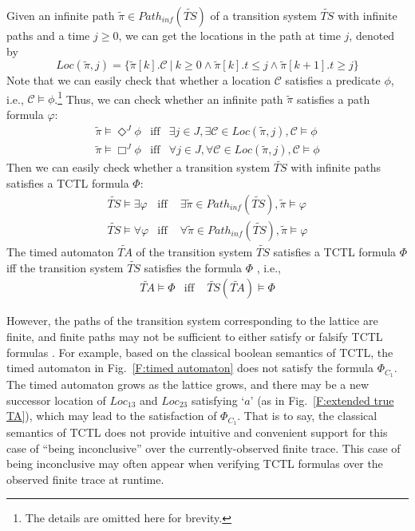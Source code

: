 \documentclass[10pt,conference,compsocconf,letterpaper]{IEEEtran}
\begin{document}
Given an infinite path $\widetilde{\pi}\in Path_{inf}(\widetilde{TS})$ of a transition system $\widetilde{TS}$ with infinite paths and a time $j \geq 0$, we can get the locations in the path at time $j$, denoted by
$$Loc(\widetilde{\pi}, j) =\{\widetilde{\pi}[k].\mathcal{C}~|~k\geq 0 \wedge \widetilde{\pi}[k].t\leq j \wedge \widetilde{\pi}[k+1].t\geq j\}$$
Note that we can easily check that whether a location $\mathcal{C}$ satisfies a predicate $\phi$, i.e., $\mathcal{C}\models \phi$.\footnote{The details are omitted here for brevity.} Thus, we can check whether an infinite path $\widetilde{\pi}$ satisfies a path formula $\varphi$:
\begin{eqnarray}
    \widetilde{\pi} \models \Diamond^J \phi & \textrm{iff} & \exists j\in J, \exists \mathcal{C}\in Loc(\widetilde{\pi}, j), \mathcal{C}\models \phi \\
    \widetilde{\pi} \models \Box^J \phi & \textrm{iff} & \forall j\in J, \forall \mathcal{C}\in Loc(\widetilde{\pi}, j), \mathcal{C}\models \phi
\end{eqnarray}
Then we can easily check whether a transition system $\widetilde{TS}$ with infinite paths satisfies a TCTL formula $\Phi$:
\begin{eqnarray}\label{eq:inf TS and phi}
\widetilde{TS} \models \exists \varphi & \textrm{iff } & \exists \widetilde{\pi}\in Path_{inf}(\widetilde{TS}), \widetilde{\pi}\models \varphi\\
\widetilde{TS} \models \forall \varphi & \textrm{iff } & \forall \widetilde{\pi}\in Path_{inf}(\widetilde{TS}), \widetilde{\pi}\models \varphi
\end{eqnarray}
The timed automaton $\widetilde{TA}$ of the transition system $\widetilde{TS}$ satisfies a TCTL formula $\Phi$ iff the transition system $\widetilde{TS}$ satisfies the formula $\Phi$ \cite{Baier08}, i.e.,
\begin{eqnarray}\label{eq:inf TA and Phi}
\widetilde{TA}\models \Phi & \textrm{iff } & \widetilde{TS}(\widetilde{TA})\models \Phi
\end{eqnarray}

However, the paths of the transition system corresponding to the lattice are finite, and finite paths may not be sufficient to either satisfy or falsify TCTL formulas \cite{Bauer11, Wei12}. For example, based on the classical boolean semantics of TCTL, the timed automaton in Fig.~\ref{F:timed automaton} does not satisfy the formula $\Phi_{C_1}$. The timed automaton grows as the lattice grows, and there may be a new successor location of $Loc_{13}$ and $Loc_{23}$ satisfying `$a$' (as in Fig.~\ref{F:extended true TA}), which may lead to the satisfaction of $\Phi_{C_1}$. That is to say, the classical semantics of TCTL does not provide intuitive and convenient support for this case of ``being inconclusive'' over the currently-observed finite trace. This case of being inconclusive may often appear when verifying TCTL formulas over the observed finite trace at runtime.
\end{document}
